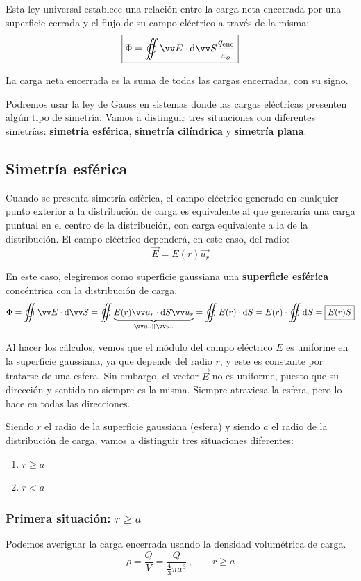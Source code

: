 \documentclass[a4paper]{book}
\begin{document}
Esta ley universal establece una relación entre la carga neta encerrada por una superficie cerrada y el flujo de su campo eléctrico a través de la misma:
\[\boxed{\Phi = \varoiint \vec{E}\cdot \dd\vec{S} \frac{q\subtext{enc}}{\varepsilon_o}}\]

La carga neta encerrada es la suma de todas las cargas encerradas, con su signo.

Podremos usar la ley de Gauss en sistemas donde las cargas eléctricas presenten algún tipo de simetría. Vamos a distinguir tres situaciones con diferentes simetrías: \textbf{simetría esférica}, \textbf{simetría cilíndrica} y \textbf{simetría plana}.

\subsection{Simetría esférica}
Cuando se presenta simetría esférica, el campo eléctrico generado en cualquier punto exterior a la distribución de carga es equivalente al que generaría una carga puntual en el centro de la distribución, con carga equivalente a la de la distribución. El campo eléctrico dependerá, en este caso, del radio:
\[\vec{E}=E(r)\vec{u_r}\]

En este caso, elegiremos como superficie gaussiana una \textbf{superficie esférica} concéntrica con la distribución de carga.
\[\Phi = \varoiint \vec{E}\cdot \dd \vec{S} = \varoiint \underbrace{E(r)\vec{u_r}\cdot \dd S \vec{u_r}}_{\vec{u_r} \parallelvec \vec{u_r}} = \varoiint E(r)\cdot \dd S = E(r)\cdot \varoiint \dd S  = \boxed{E(r)S}\]

Al hacer los cálculos, vemos que el módulo del campo eléctrico $E$ es uniforme en la superficie gaussiana, ya que depende del radio $r$, y este es constante por tratarse de una esfera. Sin embargo, el vector $\vec{E}$ no es uniforme, puesto que su dirección y sentido no siempre es la misma. Siempre atraviesa la esfera, pero lo hace en todas las direcciones.

Siendo $r$ el radio de la superficie gaussiana (esfera) y siendo $a$ el radio de la distribución de carga, vamos a distinguir tres situaciones diferentes:
\begin{enumerate}
	\item $r\geq a$
	\item $r<a$
\end{enumerate}

\subsubsection{Primera situación: $r\geq a$}
Podemos averiguar la carga encerrada usando la densidad volumétrica de carga.
\[\rho = \frac{Q}{V} = \frac{Q}{\frac{4}{3}\pi a^3} \, , \qquad r\geq a\]
\end{document}
